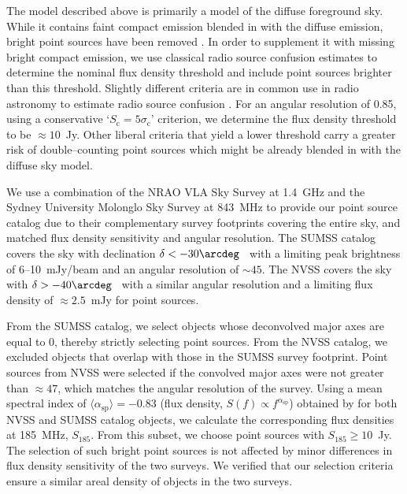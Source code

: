 \documentclass[preprint2,iop,numberedappendix,twocolappendix,appendixfloats]{emulateapj}
\begin{document}

The model described above is primarily a model of the diffuse foreground sky. While it contains faint compact emission blended in with the diffuse emission, bright point sources have been removed \citep{deo08}. In order to supplement it with missing bright compact emission, we use classical radio source confusion estimates to determine the nominal flux density threshold and include point sources brighter than this threshold. Slightly different criteria are in common use in radio astronomy to estimate radio source confusion \citep[see Appendix of][and references therein]{thy13}. For an angular resolution of 0.85\arcdeg, using a conservative `$S_\textrm{c}=5\sigma_\textrm{c}$' criterion, we determine the flux density threshold to be $\approx 10$~Jy. Other liberal criteria that yield a lower threshold carry a greater risk of double--counting point sources which might be already blended in with the diffuse sky model. 

We use a combination of the NRAO VLA Sky Survey \citep[NVSS;][]{con98} at 1.4~GHz and the Sydney University Molonglo Sky Survey \citep[SUMSS;][]{boc99,mau03} at 843~MHz to provide our point source catalog due to their complementary survey footprints covering the entire sky, and matched flux density sensitivity and angular resolution. The SUMSS catalog covers the sky with declination $\delta < -30\arcdeg$~ with a limiting peak brightness of 6--10~mJy/beam and an angular resolution of $\sim 45$\arcsec. The NVSS covers the sky with $\delta > -40\arcdeg$~ with a similar angular resolution and a limiting flux density of $\approx 2.5$~mJy for point sources. 

From the SUMSS catalog, we select objects whose deconvolved major axes are equal to 0\arcsec, thereby strictly selecting point sources. From the NVSS catalog, we excluded objects that overlap with those in the SUMSS survey footprint. Point sources from NVSS were selected if the convolved major axes were not greater than $\approx 47$\arcsec, which matches the angular resolution of the survey. Using a mean spectral index of $\langle\alpha_\textrm{sp}\rangle=-0.83$ (flux density, $S(f)\propto f^{\alpha_\textrm{sp}}$) obtained by \citet{mau03} for both NVSS and SUMSS catalog objects, we calculate the corresponding flux densities at 185~MHz, $S_{185}$. From this subset, we choose point sources with $S_{185}\geq 10$~Jy. The selection of such bright point sources is not affected by minor differences in flux density sensitivity of the two surveys. We verified that our selection criteria ensure a similar areal density of objects in the two surveys. 
\end{document}
